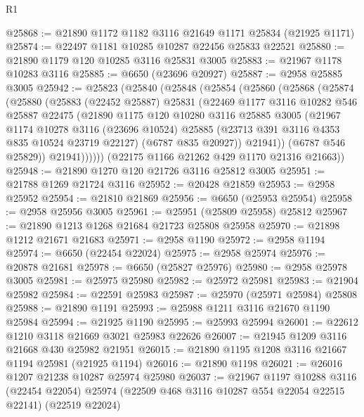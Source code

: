 \begin{lexlean}{R1}
\begin{coremodule}
@25868 := @21890 @1172 @1182 @3116 @21649 @1171 @25834 (@21925 @1171)
@25874 := @22497 @1181 @10285 @10287 @22456 @25833 @22521
@25880 := @21890 @1179 @120 @10285 @3116 @25831 @3005
@25883 := @21967 @1178 @10283 @3116
@25885 := @6650 (@23696 @20927)
@25887 := @2958 @25885 @3005
@25942 := @25823
    (@25840
      (@25848
        (@25854
          (@25860
            (@25868
              (@25874
                (@25880
                  (@25883
                    (@22452 @25887)
                    @25831
                    (@22469
                      @1177
                      @3116
                      @10282
                      @546
                      @25887
                      @22475
                      (@21890
                        @1175
                        @120
                        @10280
                        @3116
                        @25885
                        @3005
                        (@21967
                          @1174
                          @10278
                          @3116
                          (@23696 @10524)
                          @25885
                          (@23713 @391 @3116 @4353 @835 @10524 @23719 @22127)
                          (@6787 @835 @20927))
                        @21941))
                    (@6787 @546 @25829))
                  @21941))))))
      (@22175 @1166 @21262 @429 @1170 @21316 @21663))
@25948 := @21890 @1270 @120 @21726 @3116 @25812 @3005
@25951 := @21788 @1269 @21724 @3116
@25952 := @20428 @21859
@25953 := @2958 @25952
@25954 := @21810 @21869
@25956 := @6650 (@25953 @25954)
@25958 := @2958 @25956 @3005
@25961 := @25951 (@25809 @25958) @25812
@25967 := @21890 @1213 @1268 @21684 @21723 @25808 @25958
@25970 := @21898 @1212 @21671 @21683
@25971 := @2958 @1190
@25972 := @2958 @1194
@25974 := @6650 (@22454 @22024)
@25975 := @2958 @25974
@25976 := @20878 @21681
@25978 := @6650 (@25827 @25976)
@25980 := @2958 @25978 @3005
@25981 := @25975 @25980
@25982 := @25972 @25981
@25983 := @21904 @25982
@25984 := @22591 @25983
@25987 := @25970 (@25971 @25984) @25808
@25988 := @21890 @1191
@25993 := @25988 @1211 @3116 @21670 @1190 @25984
@25994 := @21925 @1190
@25995 := @25993 @25994
@26001 := @22612 @1210 @3118 @21669 @3021 @25983 @22626
@26007 := @21945 @1209 @3116 @21668 @430 @25982 @21951
@26015 := @21890 @1195 @1208 @3116 @21667 @1194 @25981 (@21925 @1194)
@26016 := @21890 @1198
@26021 := @26016 @1207 @21238 @10287 @25974 @25980
@26037 := @21967
    @1197
    @10288
    @3116
    (@22454 @22054)
    @25974
    (@22509 @468 @3116 @10287 @554 @22054 @22515 @22141)
    (@22519 @22024)

\end{coremodule}
\end{lexlean}
